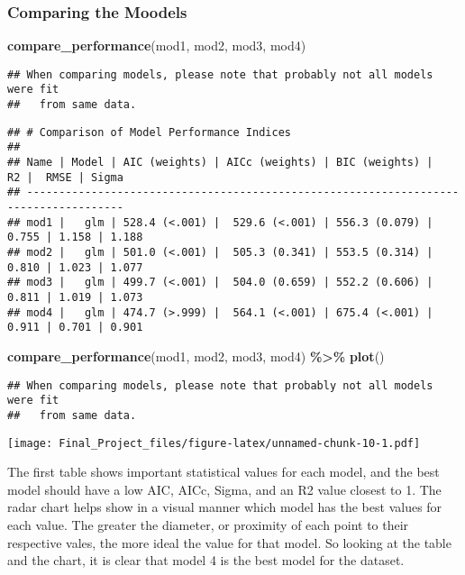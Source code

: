 \documentclass[
]{article}
\newenvironment{Shaded}{\begin{snugshade}}{\end{snugshade}}
\newcommand{\FunctionTok}[1]{\textcolor[rgb]{0.13,0.29,0.53}{\textbf{#1}}}
\newcommand{\NormalTok}[1]{#1}
\newcommand{\SpecialCharTok}[1]{\textcolor[rgb]{0.81,0.36,0.00}{\textbf{#1}}}
\begin{document}
\subsubsection{Comparing the Moodels}\label{comparing-the-moodels}

\begin{Shaded}
\begin{Highlighting}[]
\FunctionTok{compare\_performance}\NormalTok{(mod1, mod2, mod3, mod4)}
\end{Highlighting}
\end{Shaded}

\begin{verbatim}
## When comparing models, please note that probably not all models were fit
##   from same data.
\end{verbatim}

\begin{verbatim}
## # Comparison of Model Performance Indices
## 
## Name | Model | AIC (weights) | AICc (weights) | BIC (weights) |    R2 |  RMSE | Sigma
## -------------------------------------------------------------------------------------
## mod1 |   glm | 528.4 (<.001) |  529.6 (<.001) | 556.3 (0.079) | 0.755 | 1.158 | 1.188
## mod2 |   glm | 501.0 (<.001) |  505.3 (0.341) | 553.5 (0.314) | 0.810 | 1.023 | 1.077
## mod3 |   glm | 499.7 (<.001) |  504.0 (0.659) | 552.2 (0.606) | 0.811 | 1.019 | 1.073
## mod4 |   glm | 474.7 (>.999) |  564.1 (<.001) | 675.4 (<.001) | 0.911 | 0.701 | 0.901
\end{verbatim}

\begin{Shaded}
\begin{Highlighting}[]
\FunctionTok{compare\_performance}\NormalTok{(mod1, mod2, mod3, mod4) }\SpecialCharTok{\%\textgreater{}\%} \FunctionTok{plot}\NormalTok{()}
\end{Highlighting}
\end{Shaded}

\begin{verbatim}
## When comparing models, please note that probably not all models were fit
##   from same data.
\end{verbatim}

\texttt{[image: Final\_Project\_files/figure-latex/unnamed-chunk-10-1.pdf]}

The first table shows important statistical values for each model, and
the best model should have a low AIC, AICc, Sigma, and an R2 value
closest to 1. The radar chart helps show in a visual manner which model
has the best values for each value. The greater the diameter, or
proximity of each point to their respective vales, the more ideal the
value for that model. So looking at the table and the chart, it is clear
that model 4 is the best model for the dataset.
\end{document}

